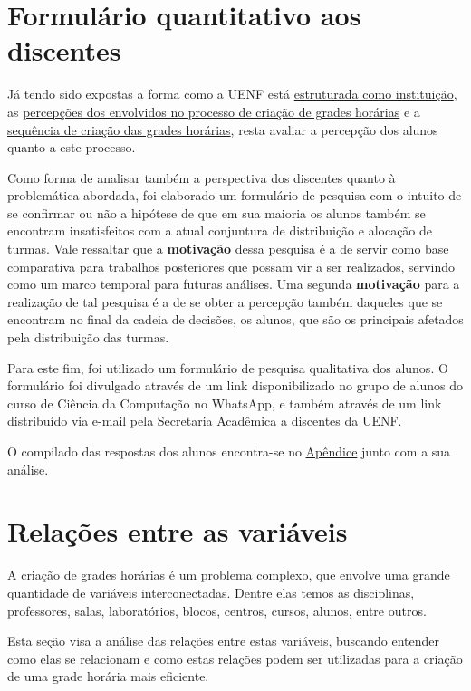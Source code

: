 \section{Formulário quantitativo aos discentes} \label{sec:formulario} %

Já tendo sido expostas a forma como a UENF está \hyperref[sec:estatuto]{estruturada como instituição}, as \hyperref[sec:entrevistas]{percepções dos envolvidos no processo de criação de grades horárias} e a \hyperref[sec:sequencia]{sequência de criação das grades horárias}, resta avaliar a percepção dos alunos quanto a este processo.

Como forma de analisar também a perspectiva dos discentes quanto à problemática abordada, foi elaborado um formulário de pesquisa com o intuito de se confirmar ou não a hipótese de que em sua maioria os alunos também se encontram insatisfeitos com a atual conjuntura de distribuição e alocação de turmas. Vale ressaltar que a \textbf{motivação} dessa pesquisa é a de servir como base comparativa para trabalhos posteriores que possam vir a ser realizados, servindo como um marco temporal para futuras análises. Uma segunda \textbf{motivação} para a realização de tal pesquisa é a de se obter a percepção também daqueles que se encontram no final da cadeia de decisões, os alunos, que são os principais afetados pela distribuição das turmas.

Para este fim, foi utilizado um formulário de pesquisa qualitativa dos alunos. O formulário foi divulgado através de um link disponibilizado no grupo de alunos do curso de Ciência da Computação no WhatsApp, e também através de um link distribuído via e-mail pela Secretaria Acadêmica a discentes da UENF.

O compilado das respostas dos alunos encontra-se no \hyperref[chap:Formulário de pesquisa]{Apêndice} junto com a sua análise.

\section{Relações entre as variáveis} \label{sec:relacoes}  %

A criação de grades horárias é um problema complexo, que envolve uma grande quantidade de variáveis interconectadas. Dentre elas temos as disciplinas, professores, salas, laboratórios, blocos, centros, cursos, alunos, entre outros.

Esta seção visa a análise das relações entre estas variáveis, buscando entender como elas se relacionam e como estas relações podem ser utilizadas para a criação de uma grade horária mais eficiente.

